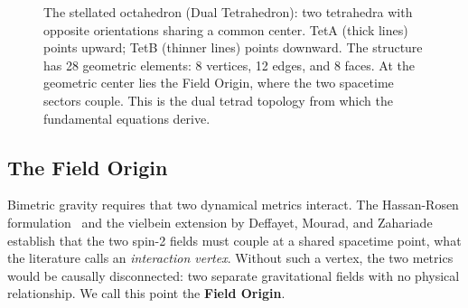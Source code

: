 \documentclass[aps,prd,preprint,superscriptaddress,showpacs,preprintnumbers,amsmath,amssymb,nofootinbib]{revtex4-2}
\begin{document}
\begin{figure}[H]
\centering
\hspace{0.1\textwidth}%
\caption{The stellated octahedron (Dual Tetrahedron): two tetrahedra with opposite orientations sharing a common center. TetA (thick lines) points upward; TetB (thinner lines) points downward. The structure has 28 geometric elements: 8 vertices, 12 edges, and 8 faces. At the geometric center lies the Field Origin, where the two spacetime sectors couple. This is the dual tetrad topology from which the fundamental equations derive.}
\label{fig:stellated}
\end{figure}

\subsection{The Field Origin}
\label{subsec:origin}

Bimetric gravity requires that two dynamical metrics interact. The Hassan-Rosen formulation~\cite{hassan2012} and the vielbein extension by Deffayet, Mourad, and Zahariade~\cite{deffayet2013} establish that the two spin-2 fields must couple at a shared spacetime point, what the literature calls an \emph{interaction vertex}. Without such a vertex, the two metrics would be causally disconnected: two separate gravitational fields with no physical relationship. We call this point the \textbf{Field Origin}.
\end{document}
